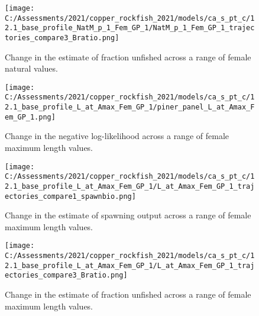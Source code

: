 \documentclass[11pt,
  english,
  a4paper,
]{article}
\begin{document}
\tagmcend\tagstructend


\begin{figure}
\centering
\texttt{[image: C:/Assessments/2021/copper\_rockfish\_2021/models/ca\_s\_pt\_c/12.1\_base\_profile\_NatM\_p\_1\_Fem\_GP\_1/NatM\_p\_1\_Fem\_GP\_1\_trajectories\_compare3\_Bratio.png]}
\caption{Change in the estimate of fraction unfished across a range of female natural values.\label{fig:m-depl}}
\end{figure}

\tagmcend\tagstructend


\begin{figure}
\centering
\texttt{[image: C:/Assessments/2021/copper\_rockfish\_2021/models/ca\_s\_pt\_c/12.1\_base\_profile\_L\_at\_Amax\_Fem\_GP\_1/piner\_panel\_L\_at\_Amax\_Fem\_GP\_1.png]}
\caption{Change in the negative log-likelihood across a range of female maximum length values.\label{fig:linf-profile}}
\end{figure}

\tagmcend\tagstructend


\begin{figure}
\centering
\texttt{[image: C:/Assessments/2021/copper\_rockfish\_2021/models/ca\_s\_pt\_c/12.1\_base\_profile\_L\_at\_Amax\_Fem\_GP\_1/L\_at\_Amax\_Fem\_GP\_1\_trajectories\_compare1\_spawnbio.png]}
\caption{Change in the estimate of spawning output across a range of female maximum length values.\label{fig:linf-ssb}}
\end{figure}

\tagmcend\tagstructend


\begin{figure}
\centering
\texttt{[image: C:/Assessments/2021/copper\_rockfish\_2021/models/ca\_s\_pt\_c/12.1\_base\_profile\_L\_at\_Amax\_Fem\_GP\_1/L\_at\_Amax\_Fem\_GP\_1\_trajectories\_compare3\_Bratio.png]}
\caption{Change in the estimate of fraction unfished across a range of female maximum length values.\label{fig:linf-depl}}
\end{figure}
\end{document}
